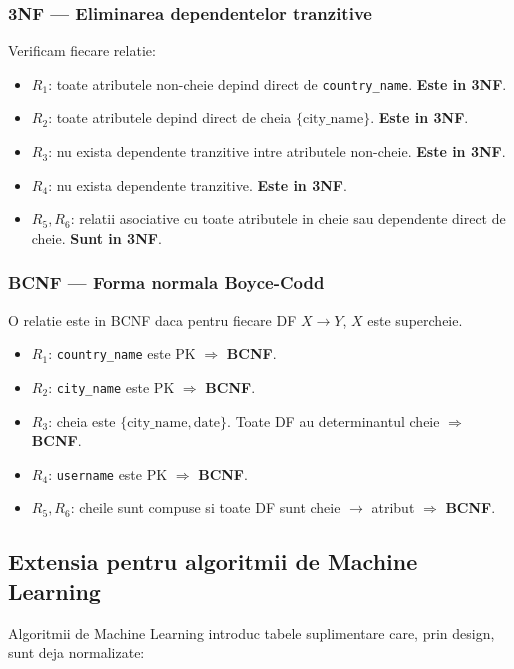 \documentclass[12pt,a4paper]{article}
\begin{document}
\subsubsection{3NF --- Eliminarea dependentelor tranzitive}

Verificam fiecare relatie:
\begin{itemize}
    \item $R_1$: toate atributele non-cheie depind direct de \texttt{country\_name}. \textbf{Este in 3NF}.
    \item $R_2$: toate atributele depind direct de cheia $\{\text{city\_name}\}$. \textbf{Este in 3NF}.
    \item $R_3$: nu exista dependente tranzitive intre atributele non-cheie. \textbf{Este in 3NF}.
    \item $R_4$: nu exista dependente tranzitive. \textbf{Este in 3NF}.
    \item $R_5, R_6$: relatii asociative cu toate atributele in cheie sau dependente direct de cheie. \textbf{Sunt in 3NF}.
\end{itemize}

\subsubsection{BCNF --- Forma normala Boyce-Codd}

O relatie este in BCNF daca pentru fiecare DF $X \rightarrow Y$, $X$ este supercheie.
\begin{itemize}
    \item $R_1$: \texttt{country\_name} este PK $\Rightarrow$ \textbf{BCNF}.
    \item $R_2$: \texttt{city\_name} este PK $\Rightarrow$ \textbf{BCNF}.
    \item $R_3$: cheia este $\{\text{city\_name}, \text{date}\}$. Toate DF au determinantul cheie $\Rightarrow$ \textbf{BCNF}.
    \item $R_4$: \texttt{username} este PK $\Rightarrow$ \textbf{BCNF}.
    \item $R_5, R_6$: cheile sunt compuse si toate DF sunt cheie $\rightarrow$ atribut $\Rightarrow$ \textbf{BCNF}.
\end{itemize}

\subsection{Extensia pentru algoritmii de Machine Learning}

Algoritmii de Machine Learning introduc tabele suplimentare care, prin design, sunt deja normalizate:
\end{document}
